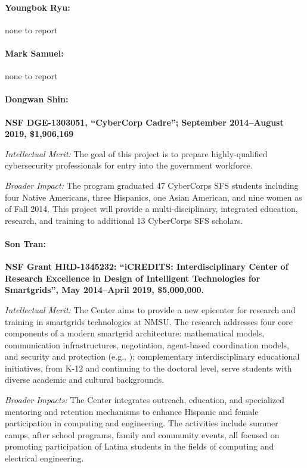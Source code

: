 \paragraph{Youngbok Ryu:} none to report

\paragraph{Mark Samuel:} none to report

\paragraph{Dongwan Shin:}\textbf{NSF DGE-1303051, ``CyberCorp Cadre''; September 2014--August 2019, \$1,906,169}

\noindent\textit{Intellectual Merit:} The goal of this project is to prepare highly-qualified cybersecurity professionals for entry into the government workforce. 

\noindent\textit{Broader Impact:} The program graduated 47 CyberCorps SFS students including four Native Americans, three Hispanics, one Asian American, and nine women as of Fall 2014. This project will provide a multi-disciplinary, integrated education, research, and training to additional 13 CyberCorps SFS scholars.

\paragraph{Son Tran:}
\textbf{NSF Grant HRD-1345232: ``iCREDITS: Interdisciplinary Center of Research Excellence in Design of Intelligent Technologies for Smartgrids'', May 2014--April 2019,  \$5,000,000.}

\noindent\textit{Intellectual Merit:} The Center aims to provide a new epicenter for research and training in smartgrids technologies at NMSU. The
	 research addresses four core components of a modern smartgrid architecture: mathematical models, communication infrastructures, negotiation,  
	 agent-based coordination models, and security and protection (e.g., \cite{cp15,ToSP15,LeSP15b,LeSPY15,LeF0SP16,TiepSP19,ChowdhuryKS018,2016grid,SonPNS14}); complementary interdisciplinary educational initiatives, from K-12 and continuing to the doctoral level,  serve students with diverse academic and cultural backgrounds. 
	 
\noindent\textit{Broader Impacts:} The Center integrates outreach, education, and specialized mentoring and retention mechanisms to enhance Hispanic and female participation in computing and engineering. The activities include summer camps, after school programs, family and community events, all focused on promoting participation of Latina students in the fields of computing and electrical engineering.

